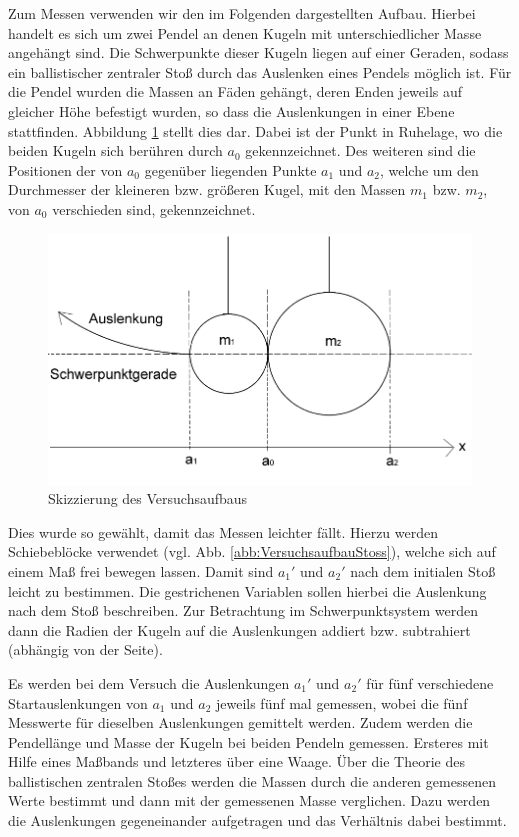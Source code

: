 		Zum Messen verwenden wir den im Folgenden dargestellten Aufbau. Hierbei handelt es sich um zwei Pendel an denen Kugeln mit unterschiedlicher Masse angehängt sind. Die Schwerpunkte dieser Kugeln liegen auf einer Geraden, sodass ein ballistischer zentraler Stoß durch das Auslenken eines Pendels möglich ist. Für die Pendel wurden die Massen an Fäden gehängt, deren Enden jeweils auf gleicher Höhe befestigt wurden, so dass die Auslenkungen in einer Ebene stattfinden. Abbildung \ref{abb:VersuchsskizzeStoss} stellt dies dar. Dabei ist der Punkt in Ruhelage, wo die beiden Kugeln sich berühren durch $a_0$ gekennzeichnet. Des weiteren sind die Positionen der von $a_0$ gegenüber liegenden Punkte $a_1$ und $a_2$, welche um den Durchmesser der kleineren bzw. größeren Kugel, mit den Massen $m_1$ bzw. $m_2$, von $a_0$ verschieden sind, gekennzeichnet.
		\begin{figure}[ht]
			\centering
			\includegraphics[width=\textwidth]{Kugelstoss.png}
			\caption{Skizzierung des Versuchsaufbaus}
			\label{abb:VersuchsskizzeStoss}	
		\end{figure}
		Dies wurde so gewählt, damit das Messen leichter fällt. Hierzu werden Schiebeblöcke verwendet (vgl. Abb. \ref{abb:VersuchsaufbauStoss}), welche sich auf einem Maß frei bewegen lassen. Damit sind $a_1'$ und $a_2'$ nach dem initialen Stoß leicht zu bestimmen. Die gestrichenen Variablen sollen hierbei die Auslenkung nach dem Stoß beschreiben. Zur Betrachtung im Schwerpunktsystem werden dann die Radien der Kugeln auf die Auslenkungen addiert bzw. subtrahiert (abhängig von der Seite). %
		
		Es werden bei dem Versuch die Auslenkungen $a_1'$ und $a_2'$ für fünf verschiedene Startauslenkungen von $a_1$ und $a_2$ jeweils fünf mal gemessen, wobei die fünf Messwerte für dieselben Auslenkungen gemittelt werden.
		Zudem werden die Pendellänge und Masse der Kugeln bei beiden Pendeln gemessen. Ersteres mit Hilfe eines Maßbands und letzteres über eine Waage.	
		Über die Theorie des ballistischen zentralen Stoßes werden die Massen durch die anderen gemessenen Werte bestimmt und dann mit der gemessenen Masse verglichen. Dazu werden die Auslenkungen gegeneinander aufgetragen und das Verhältnis dabei bestimmt.
				
